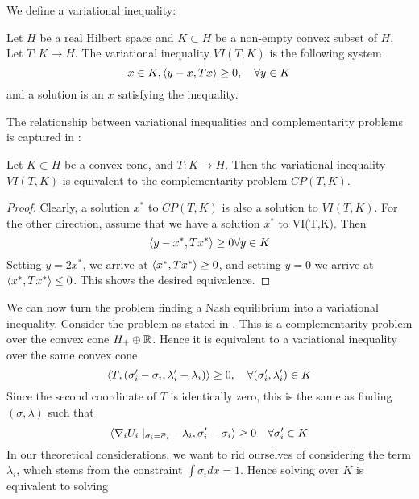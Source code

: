 We define a variational inequality:
\begin{definition}
  Let $H$ be a real Hilbert space and $K\subset H$ be a non-empty convex subset of $H$. Let $T: K \to H$. The variational inequality $VI(T,K)$ is the following system
  \begin{equation}
    x \in K, \left \langle y-x,Tx \right \rangle \geq 0, \quad \forall y \in K
  \end{equation}
  and a solution is an $x$ satisfying the inequality.
\end{definition}
The relationship between variational inequalities and complementarity problems is captured in \citep[Proposition 12.1]{hadjisavvas2006handbook}:
\begin{proposition}
  Let $K\subset H$ be a convex cone, and $T: K \to H$. Then the variational inequality $VI(T,K)$ is equivalent to the complementarity problem $CP(T,K)$.
\end{proposition}
\begin{proof}
  Clearly, a solution $x^*$ to $CP(T,K)$ is also a solution to $VI(T,K)$. For the other direction, assume that we have a solution $x^*$ to VI(T,K). Then
  \begin{equation}
    \left \langle y - x^*,Tx^* \right \rangle \geq 0 \forall y \in K
  \end{equation}
  Setting $y = 2x^*$, we arrive at $\left \langle x^*,Tx^* \right \rangle \geq 0$, and setting $y=0$ we arrive at $\left \langle x^*,Tx^* \right \rangle \leq 0$. This shows the desired equivalence.
\end{proof}
We can now turn the problem finding a Nash equilibrium into a variational inequality. Consider the problem as stated in . This is a complementarity problem over the convex cone $H_+ \oplus \mathbb{R}$. Hence it is equivalent to a variational inequality over the same convex cone
\begin{equation}
  \left \langle T,(\sigma_i' -\sigma_i,\lambda_i'-\lambda_i) \right \rangle \geq 0, \quad \forall (\sigma_i', \lambda_i') \in K
\end{equation}
Since the second coordinate of $T$ is identically zero, this is the same as finding $(\sigma,\lambda)$ such that
\begin{equation}
  \label{eq:simp_var_eq}
  \ip{\nabla_i U_i \mid_{\sigma_i = \overbar{\sigma}_i} - \lambda_i}{\sigma_i' -\sigma_i} \geq 0 \quad \forall \sigma_i' \in K
\end{equation}
In our theoretical considerations, we want to rid ourselves of considering the term $\lambda_i$, which stems from the constraint $\int \sigma_i dx = 1$. Hence solving  over $K$ is equivalent to solving
